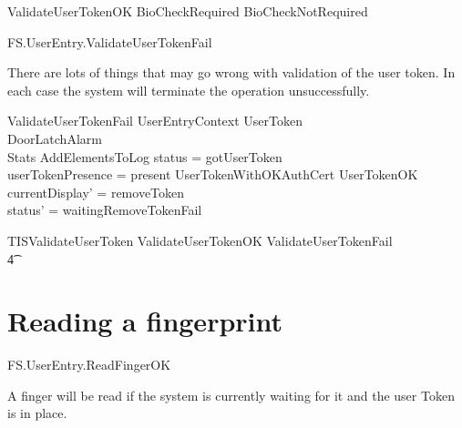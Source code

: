 \begin{zed}
ValidateUserTokenOK  BioCheckRequired \lor BioCheckNotRequired
\end{zed}

\begin{traceunit}{FS.UserEntry.ValidateUserTokenFail}
\end{traceunit}



There are lots of things that may go wrong with validation of the user
token. In each case the system will terminate the operation unsuccessfully.

\begin{schema}{ValidateUserTokenFail}
        UserEntryContext
\also
        \Xi UserToken
\\      \Xi DoorLatchAlarm
\\      \Xi Stats       
\also
        AddElementsToLog
\where
        status = gotUserToken
\\      userTokenPresence = present
\also
        \lnot UserTokenWithOKAuthCert \land \lnot UserTokenOK 
\also
        currentDisplay' = removeToken
\\      status' = waitingRemoveTokenFail
\end{schema}

\begin{zed}
        TISValidateUserToken  ValidateUserTokenOK \lor
        ValidateUserTokenFail 
\\ \t4 \lor
        [~UserTokenTorn | status = gotUserToken ]
\end{zed}

\section{Reading a fingerprint}

\begin{traceunit}{FS.UserEntry.ReadFingerOK}
\end{traceunit}

A finger will be read if the system is currently waiting for it and
the user Token is in place.


